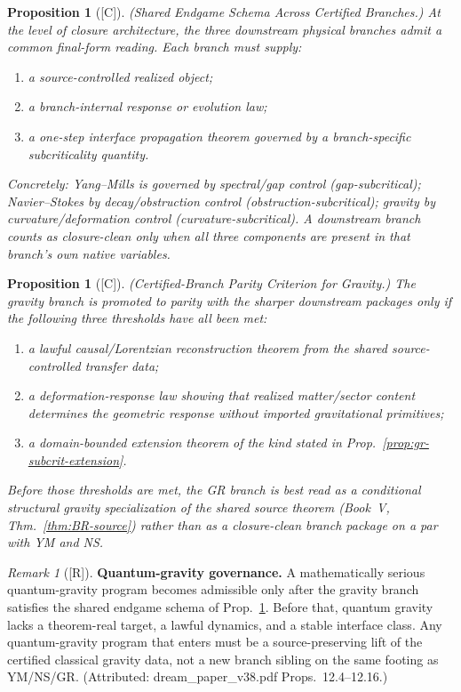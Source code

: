 \documentclass[12pt,oneside]{amsbook}
\theoremstyle{plain}
\newtheorem{proposition}[theorem]{Proposition}
\theoremstyle{definition}
\theoremstyle{remark}
\newtheorem{remark}[theorem]{Remark}
\newcommand{\status}[1]{\textup{[#1]}}
\begin{document}
\begin{proposition}[\status{C}]\label{prop:gr-endgame-schema}
\textup{(Shared Endgame Schema Across Certified Branches.)}
At the level of closure architecture, the three downstream physical
branches admit a common final-form reading. Each branch must supply:
\begin{enumerate}[label=\textup{(\roman*)}]
 \item a source-controlled realized object;
 \item a branch-internal response or evolution law;
 \item a one-step interface propagation theorem governed by a
 branch-specific subcriticality quantity.
\end{enumerate}
Concretely: Yang--Mills is governed by spectral/gap control
(gap-subcritical); Navier--Stokes by decay/obstruction control
(obstruction-subcritical); gravity by curvature/deformation control
(curvature-subcritical). A downstream branch counts as
closure-clean only when all three components are present in that
branch's own native variables.
\end{proposition}

\begin{proposition}[\status{C}]\label{prop:gr-parity-criterion}
\textup{(Certified-Branch Parity Criterion for Gravity.)}
The gravity branch is promoted to parity with the sharper downstream
packages only if the following three thresholds have all been met:
\begin{enumerate}[label=\textup{(\arabic*)}]
 \item a lawful causal/Lorentzian reconstruction theorem from the
 shared source-controlled transfer data;
 \item a deformation-response law showing that realized
 matter/sector content determines the geometric response without
 imported gravitational primitives;
 \item a domain-bounded extension theorem of the kind stated in
 Prop.~\ref{prop:gr-subcrit-extension}.
\end{enumerate}
Before those thresholds are met, the GR branch is best read as a
conditional structural gravity specialization of the shared source
theorem (Book~V, Thm.~\ref{thm:BR-source}) rather than as a
closure-clean branch package on a par with YM and NS.
\end{proposition}

\begin{remark}[\status{R}]\label{rem:gr-quantum-gravity}
\textbf{Quantum-gravity governance.}
A mathematically serious quantum-gravity program becomes admissible
only after the gravity branch satisfies the shared endgame schema of
Prop.~\ref{prop:gr-endgame-schema}. Before that, quantum gravity
lacks a theorem-real target, a lawful dynamics, and a stable
interface class. Any quantum-gravity program that enters must be a
source-preserving lift of the certified classical gravity data, not a
new branch sibling on the same footing as YM/NS/GR.
(Attributed: dream\_paper\_v38.pdf Props.~12.4--12.16.)
\end{remark}
\end{document}
